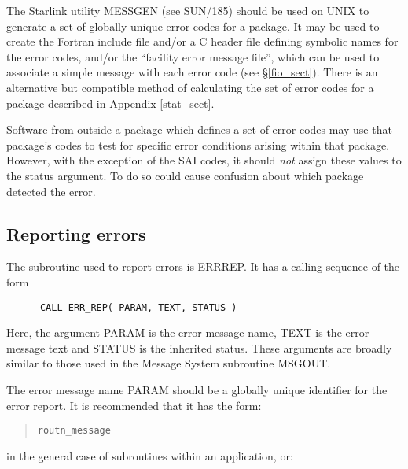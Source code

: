 \documentclass[twoside,11pt]{article}
\newcommand{\htmlref}[2]{#1}
\newcommand{\latex}[1]{#1}
\newcommand{\xref}[3]{#1}
\newcommand{\xlabel}[1]{}
\renewcommand{\_}{\texttt{\symbol{95}}}
\begin{document}
The Starlink utility
\xref{MESSGEN}{sun185}{} \latex{ (see SUN/185)}
should be used on UNIX to generate
a set of globally unique error codes for a package. It may be used to create
the Fortran include file and/or a C header file defining symbolic names
for the error codes, and/or the ``facility error message file'', which
can be used to
\htmlref{associate a simple message}{fio_sect}
with each error code\latex{ (see \S\ref{fio_sect})}.
There is
\htmlref{an alternative}{stat_sect}
but compatible method of calculating the set of error codes for a
package\latex{ described in Appendix \ref{stat_sect}}.

Software from outside a package which defines a set of error codes may
use that package's codes to test for specific error conditions arising within
that package.
However, with the exception of the SAI\_\_ codes, it should \emph{not} assign
these values to the status argument.
To do so could cause confusion about which package detected the error.

\subsection{\xlabel{reporting_errors}Reporting errors \label{report_sect}}

The subroutine used to report errors is ERR\_REP.
It has a calling sequence of the form

\begin {small}
\begin{verbatim}
      CALL ERR_REP( PARAM, TEXT, STATUS )
\end{verbatim}
\end {small}

Here, the argument PARAM is the error message name, TEXT is the error message
text and STATUS is the inherited status.
These arguments are broadly similar to those used in the Message System
subroutine MSG\_OUT.

The error message name PARAM should be a globally unique identifier for the
error report.
It is recommended that it has the form:

\begin {quote}
\begin {small}
\begin{verbatim}
routn_message
\end{verbatim}
\end {small}
\end {quote}

in the general case of subroutines within an application, or:
\end{document}
